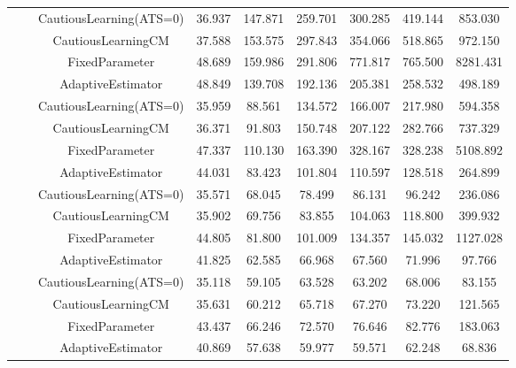 \begin{table}[!h]
\begin{tabular}[t]{ccccccccc}
 &  & CautiousLearning(ATS=0) & 36.937 & 147.871 & 259.701 & 300.285 & 419.144 & 853.030\\

 &  & CautiousLearningCM & 37.588 & 153.575 & 297.843 & 354.066 & 518.865 & 972.150\\

 & \multirow[t]{-4}{*}{\centering\arraybackslash 0.25} & FixedParameter & 48.689 & 159.986 & 291.806 & 771.817 & 765.500 & 8281.431\\
\cmidrule{2-9}
 &  & AdaptiveEstimator & 48.849 & 139.708 & 192.136 & 205.381 & 258.532 & 498.189\\

 &  & CautiousLearning(ATS=0) & 35.959 & 88.561 & 134.572 & 166.007 & 217.980 & 594.358\\

 &  & CautiousLearningCM & 36.371 & 91.803 & 150.748 & 207.122 & 282.766 & 737.329\\

 & \multirow[t]{-4}{*}{\centering\arraybackslash 0.35} & FixedParameter & 47.337 & 110.130 & 163.390 & 328.167 & 328.238 & 5108.892\\
\cmidrule{2-9}
 &  & AdaptiveEstimator & 44.031 & 83.423 & 101.804 & 110.597 & 128.518 & 264.899\\

 &  & CautiousLearning(ATS=0) & 35.571 & 68.045 & 78.499 & 86.131 & 96.242 & 236.086\\

 &  & CautiousLearningCM & 35.902 & 69.756 & 83.855 & 104.063 & 118.800 & 399.932\\

 & \multirow[t]{-4}{*}{\centering\arraybackslash 0.50} & FixedParameter & 44.805 & 81.800 & 101.009 & 134.357 & 145.032 & 1127.028\\
\cmidrule{2-9}
 &  & AdaptiveEstimator & 41.825 & 62.585 & 66.968 & 67.560 & 71.996 & 97.766\\

 &  & CautiousLearning(ATS=0) & 35.118 & 59.105 & 63.528 & 63.202 & 68.006 & 83.155\\

 &  & CautiousLearningCM & 35.631 & 60.212 & 65.718 & 67.270 & 73.220 & 121.565\\

 & \multirow[t]{-4}{*}{\centering\arraybackslash 0.75} & FixedParameter & 43.437 & 66.246 & 72.570 & 76.646 & 82.776 & 183.063\\
\cmidrule{2-9}
 &  & AdaptiveEstimator & 40.869 & 57.638 & 59.977 & 59.571 & 62.248 & 68.836\\


\end{tabular}
\end{table}
